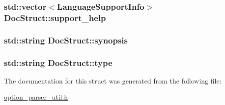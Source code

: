 \hypertarget{structDocStruct_a5ab754df0511c5d44c26063e59472b6b}{
\subsubsection[{support\-\_\-help}]{\setlength{\rightskip}{0pt plus 5cm}std\-::vector$<${\bf Language\-Support\-Info}$>$ Doc\-Struct\-::support\-\_\-help}}\label{structDocStruct_a5ab754df0511c5d44c26063e59472b6b}
\hypertarget{structDocStruct_af808bfe418f51eacf0c1101513d3677f}{
\subsubsection[{synopsis}]{\setlength{\rightskip}{0pt plus 5cm}std\-::string Doc\-Struct\-::synopsis}}\label{structDocStruct_af808bfe418f51eacf0c1101513d3677f}
\hypertarget{structDocStruct_a91a29979c17e21f606349d0450a75e8e}{
\subsubsection[{type}]{\setlength{\rightskip}{0pt plus 5cm}std\-::string Doc\-Struct\-::type}}\label{structDocStruct_a91a29979c17e21f606349d0450a75e8e}


The documentation for this struct was generated from the following file\-:\begin{DoxyCompactItemize}
\item 
\hyperlink{option__parser__util_8h}{option\-\_\-parser\-\_\-util.\-h}\end{DoxyCompactItemize}
